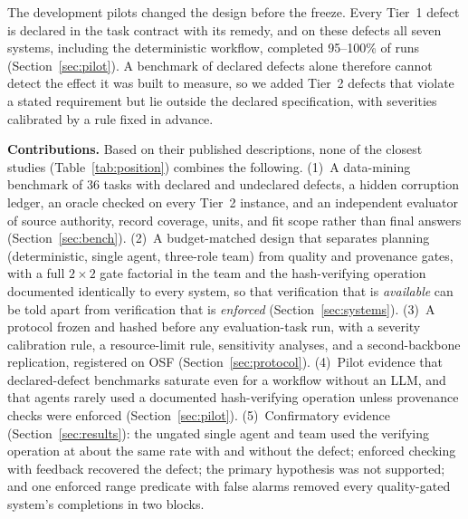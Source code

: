 \documentclass[conference]{IEEEtran}
\begin{document}
The development pilots changed the design before the freeze. Every Tier~1 defect is declared in the task contract
with its remedy, and on these defects all seven systems, including the deterministic workflow, completed 95--100\%
of runs (Section~\ref{sec:pilot}). A benchmark of declared defects alone therefore cannot detect the effect it was
built to measure, so we added Tier~2 defects that violate a stated requirement but lie outside the declared
specification, with severities calibrated by a rule fixed in advance.

\textbf{Contributions.} Based on their published descriptions, none of the closest studies
(Table~\ref{tab:position}) combines the following.
(1)~A data-mining benchmark of 36 tasks with declared and undeclared defects, a hidden corruption ledger, an oracle
checked on every Tier~2 instance, and an independent evaluator of source authority, record coverage, units, and fit
scope rather than final answers (Section~\ref{sec:bench}).
(2)~A budget-matched design that separates planning (deterministic, single agent, three-role team) from quality and
provenance gates, with a full $2\times2$ gate factorial in the team and the hash-verifying operation documented
identically to every system, so that verification that is \emph{available} can be told apart from verification
that is \emph{enforced} (Section~\ref{sec:systems}).
(3)~A protocol frozen and hashed before any evaluation-task run, with a severity calibration rule, a resource-limit
rule, sensitivity analyses, and a second-backbone replication, registered on OSF (Section~\ref{sec:protocol}).
(4)~Pilot evidence that declared-defect benchmarks saturate even for a workflow without an LLM, and that agents
rarely used a documented hash-verifying operation unless provenance checks were enforced (Section~\ref{sec:pilot}).
(5)~Confirmatory evidence (Section~\ref{sec:results}): the ungated single agent and team used the verifying
operation at about the same rate with and without the defect; enforced checking with feedback recovered the defect;
the primary hypothesis was not supported; and one enforced range predicate with false alarms removed every
quality-gated system's completions in two blocks.

\end{document}
